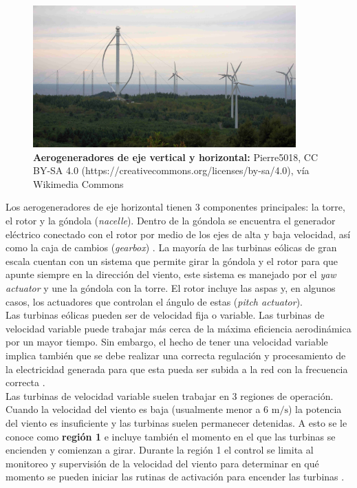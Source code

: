 {\begin{figure}[H]
    \centering
    \includegraphics[width=0.9\textwidth]{Imagenes/Eole_cap-chat.jpeg}
    \caption{\small{\textbf{Aerogeneradores de eje vertical y horizontal:} Pierre5018, CC BY-SA 4.0 (https://creativecommons.org/licenses/by-sa/4.0), vía Wikimedia Commons}}
    \label{VAWT}
\end{figure}

Los aerogeneradores de eje horizontal tienen 3 componentes principales: la torre, el rotor y 
la góndola (\emph{nacelle}). Dentro de la góndola se encuentra el generador eléctrico conectado 
con el rotor por medio de los ejes de alta y baja velocidad, así como la caja de cambios 
(\emph{gearbox}) \cite{Pao2009}. La mayoría de las turbinas eólicas de gran escala cuentan con 
un sistema que permite girar la góndola y el rotor para que apunte siempre en la dirección del 
viento, este sistema es manejado por el \emph{yaw actuator} y une la góndola con la torre. El 
rotor incluye las aspas y, en algunos casos, los actuadores que controlan el ángulo de estas 
(\emph{pitch actuator}). 
\\

Las turbinas eólicas pueden ser de velocidad fija o variable. Las turbinas de velocidad variable 
puede trabajar más cerca de la máxima eficiencia aerodinámica por un mayor tiempo. Sin embargo, 
el hecho de tener una velocidad variable implica también que se debe realizar una correcta 
regulación y procesamiento de la electricidad generada para que esta pueda ser subida a la 
red con la frecuencia correcta \cite{Pao2009}.
\\

Las turbinas de velocidad variable suelen trabajar en 3 regiones de operación. Cuando la 
velocidad del viento es baja (usualmente menor a 6 $\text{m}/\text{s}$) la potencia del viento 
es insuficiente y las turbinas suelen permanecer detenidas. A esto se le conoce como \textbf{región 1} 
e incluye también el momento en el que las turbinas se encienden y comienzan a girar. Durante 
la región 1 el control se limita al monitoreo y supervisión de la velocidad del viento para 
determinar en qué momento se pueden iniciar las rutinas de activación para encender las turbinas \cite{Johnson2004}.
\\

}
